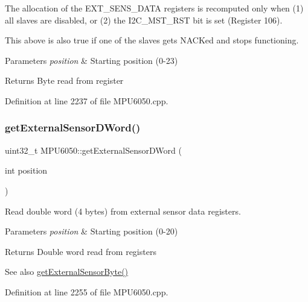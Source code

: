The allocation of the E\+X\+T\+\_\+\+S\+E\+N\+S\+\_\+\+D\+A\+TA registers is recomputed only when (1) all slaves are disabled, or (2) the I2\+C\+\_\+\+M\+S\+T\+\_\+\+R\+ST bit is set (Register 106).

This above is also true if one of the slaves gets N\+A\+C\+Ked and stops functioning.


\begin{DoxyParams}{Parameters}
{\em position} & Starting position (0-\/23) \\
\hline
\end{DoxyParams}
\begin{DoxyReturn}{Returns}
Byte read from register 
\end{DoxyReturn}


Definition at line 2237 of file M\+P\+U6050.\+cpp.

\mbox{\label{classMPU6050_afd8983f0911e37015434bebc85185fb2}} 
\subsubsection{\texorpdfstring{getExternalSensorDWord()}{getExternalSensorDWord()}}
{\footnotesize\ttfamily uint32\+\_\+t M\+P\+U6050\+::get\+External\+Sensor\+D\+Word (\begin{DoxyParamCaption}\item[{int}]{position }\end{DoxyParamCaption})}



Read double word (4 bytes) from external sensor data registers. 


\begin{DoxyParams}{Parameters}
{\em position} & Starting position (0-\/20) \\
\hline
\end{DoxyParams}
\begin{DoxyReturn}{Returns}
Double word read from registers 
\end{DoxyReturn}
\begin{DoxySeeAlso}{See also}
\mbox{\hyperlink{classMPU6050_a7f786ab4264f40e5a95e8937ec9adcc2}{get\+External\+Sensor\+Byte()}} 
\end{DoxySeeAlso}


Definition at line 2255 of file M\+P\+U6050.\+cpp.

\mbox{\label{classMPU6050_aaee15e48af7ba78660b5754f3bb5f37a}} 
